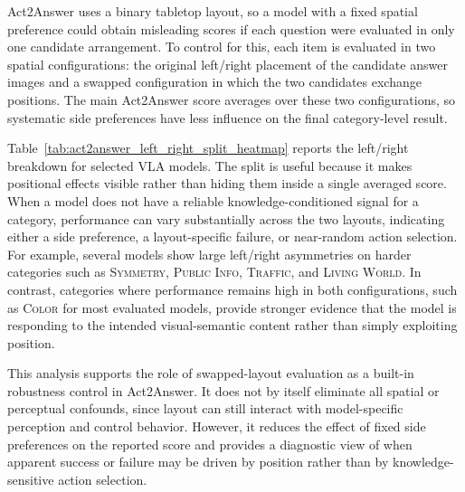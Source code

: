 \documentclass{llmxive}
\begin{document}
Act2Answer uses a binary tabletop layout, so a model with a fixed spatial preference could obtain misleading scores if each question were evaluated in only one candidate arrangement.
To control for this, each item is evaluated in two spatial configurations: the original left/right placement of the candidate answer images and a swapped configuration in which the two candidates exchange positions.
The main Act2Answer score averages over these two configurations, so systematic side preferences have less influence on the final category-level result.

Table~\ref{tab:act2answer_left_right_split_heatmap} reports the left/right breakdown for selected VLA models.
The split is useful because it makes positional effects visible rather than hiding them inside a single averaged score.
When a model does not have a reliable knowledge-conditioned signal for a category, performance can vary substantially across the two layouts, indicating either a side preference, a layout-specific failure, or near-random action selection.
For example, several models show large left/right asymmetries on harder categories such as \textsc{Symmetry}, \textsc{Public Info}, \textsc{Traffic}, and \textsc{Living World}.
In contrast, categories where performance remains high in both configurations, such as \textsc{Color} for most evaluated models, provide stronger evidence that the model is responding to the intended visual-semantic content rather than simply exploiting position.

This analysis supports the role of swapped-layout evaluation as a built-in robustness control in Act2Answer.
It does not by itself eliminate all spatial or perceptual confounds, since layout can still interact with model-specific perception and control behavior.
However, it reduces the effect of fixed side preferences on the reported score and provides a diagnostic view of when apparent success or failure may be driven by position rather than by knowledge-sensitive action selection.
\end{document}
